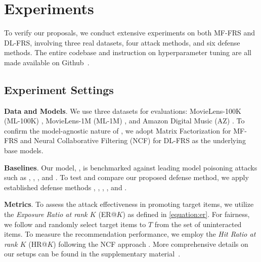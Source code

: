 \section{Experiments}
\label{sec:experiments}
To verify our proposals, we conduct extensive experiments on both MF-FRS and DL-FRS, involving three real datasets, four attack methods, and six defense methods.
The entire codebase and instruction on hyperparameter tuning are all made available on Github~\cite{github-pieck}. 

\subsection{Experiment Settings}
\label{ssec:settings}
\noindent \textbf{Data and Models}. We use three datasets for evaluations: {MovieLens-100K (ML-100K)} \cite{MovieLens}, {MovieLens-1M (ML-1M)} \cite{MovieLens}, and {Amazon Digital Music (AZ)} \cite{AZ}. 
To confirm the model-agnostic nature of \model{}, we adopt Matrix Factorization \cite{BPR} for MF-FRS and Neural Collaborative Filtering (NCF) \cite{NCF} for DL-FRS as the underlying base models.

\noindent \textbf{Baselines}.
Our model, \model{}, is benchmarked against leading model poisoning attacks such as \FRA{} \cite{fedrecattack}, \PIP{} \cite{pipattack}, \ARA{} \cite{a-hum}, and \AHUM{} \cite{a-hum}. To test \model{} and compare our proposed defense method, we apply established defense methods \NB{} \cite{NormBound}, \MEDIAN{} \cite{Media-TrimmedMean}, \TMEAN{} \cite{Media-TrimmedMean}, \KRUM{} \cite{Krum-MultiKrum}, \MKRUM{} \cite{Krum-MultiKrum} and \BULYAN{} \cite{Bulyan}.

\noindent
\textbf{Metrics}. 
To assess the attack effectiveness in promoting target items, we utilize the \emph{Exposure Ratio at rank $K$} (ER@$K$) as defined in \cref{equation:er}. 
For fairness,  we follow \FRA{} \cite{fedrecattack} and randomly select target items to ${T}$ from the set of uninteracted items.
To measure the recommendation performance, we employ the \emph{Hit Ratio at rank $K$} (HR@$K$) following the NCF approach \cite{NCF}. 
More comprehensive details on our setups can be found in the supplementary material~\cite{github-pieck-supple}.


